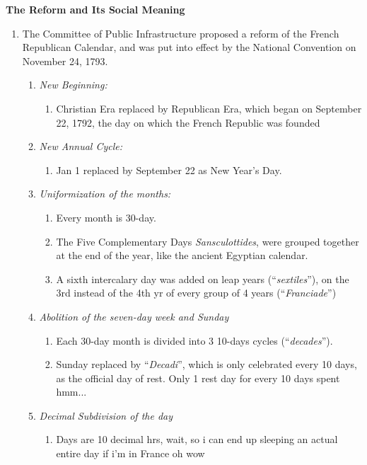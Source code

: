 \documentclass[a4paper]{article}
\begin{document}
\noindent\textbf{The Reform and Its Social Meaning}
\begin{enumerate}
	\item The Committee of Public Infrastructure proposed a reform of the French Republican Calendar, and was put into effect by the National Convention on November 24, 1793.
	\begin{enumerate}[label=\alph*.]
		\item \textit{New Beginning:}
		\begin{enumerate}[label=\roman*.]
			\item Christian Era replaced by Republican Era, which began on September 22, 1792, the day on which the French Republic was founded
		\end{enumerate} 
		\item \textit{New Annual Cycle:}
		\begin{enumerate}[label=\roman*.]
			\item Jan 1 replaced by September 22 as New Year's Day.
		\end{enumerate} 
		\item \textit{Uniformization of the months:}
		\begin{enumerate}[label=\roman*.]
			\item Every month is 30-day. 
			\item The Five Complementary Days \textit{Sansculottides}, were grouped together at the end of the year, like the ancient Egyptian calendar.
			\item A sixth intercalary day was added on leap years (“\textit{sextiles}”), on the 3rd instead of the 4th yr of every group of 4 years (“\textit{Franciade}”)
		\end{enumerate}
		\item \textit{Abolition of the seven-day week and Sunday}
		\begin{enumerate}[label=\roman*.]
			\item Each 30-day month is divided into 3 10-days cycles (“\textit{decades}”).
			\item Sunday replaced by “\textit{Decadi}”, which is only celebrated every 10 days, as the official day of rest. Only 1 rest day for every 10 days spent hmm...
		\end{enumerate} 
		\newpage
		\item \textit{Decimal Subdivision of the day}
		\begin{enumerate}[label=\roman*.]
			\item Days are 10 decimal hrs, wait, so i can end up sleeping an actual entire day if i’m in France oh wow 

\end{enumerate}
\end{enumerate}
\end{enumerate}
\end{document}

